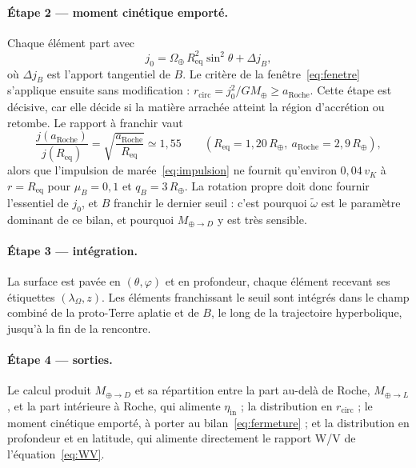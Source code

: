 \documentclass[11pt,a4paper,openany]{report}
\newcommand{\Mt}{M_{\oplus}}
\newcommand{\Rt}{R_{\oplus}}
\newcommand{\Req}{R_{\mathrm{eq}}}
\newcommand{\aR}{a_{\mathrm{Roche}}}
\begin{document}
\paragraph{Étape 2 — moment cinétique emporté.} Chaque élément part avec
\begin{equation}
j_0=\Omega_\oplus\,\Req^2\sin^2\theta+\Delta j_B,
\label{eq:j0-injection}
\end{equation}
où $\Delta j_B$ est l'apport tangentiel de $B$. Le critère de la fenêtre~\eqref{eq:fenetre}
s'applique ensuite sans modification : $r_{\mathrm{circ}}=j_0^2/G\Mt\ge\aR$. Cette étape est
décisive, car elle décide si la matière arrachée atteint la région d'accrétion ou retombe. Le
rapport à franchir vaut
\begin{equation}
\frac{j(\aR)}{j(\Req)}=\sqrt{\frac{\aR}{\Req}}\simeq1{,}55
\qquad(\Req=1{,}20\,\Rt,\ \aR=2{,}9\,\Rt),
\label{eq:saut-j}
\end{equation}
alors que l'impulsion de marée~\eqref{eq:impulsion} ne fournit qu'environ
$0{,}04\,v_K$ à $r=\Req$ pour $\mu_B=0{,}1$ et $q_B=3\,\Rt$. La rotation propre doit donc fournir
l'essentiel de $j_0$, et $B$ franchir le dernier seuil : c'est pourquoi $\tilde\omega$ est le
paramètre dominant de ce bilan, et pourquoi $M_{\oplus\to D}$ y est très sensible.

\paragraph{Étape 3 — intégration.} La surface est pavée en $(\theta,\varphi)$ et en profondeur, chaque
élément recevant ses étiquettes $(\lambda_\Omega,z)$. Les éléments franchissant le seuil sont
intégrés dans le champ combiné de la proto-Terre aplatie et de $B$, le long de la trajectoire
hyperbolique, jusqu'à la fin de la rencontre.

\paragraph{Étape 4 — sorties.} Le calcul produit $M_{\oplus\to D}$ et sa répartition entre la part
au-delà de Roche, $M_{\oplus\to L}$, et la part intérieure à Roche, qui alimente
$\eta_{\mathrm{in}}$ ; la distribution en $r_{\mathrm{circ}}$ ; le moment cinétique emporté, à
porter au bilan~\eqref{eq:fermeture} ; et la distribution en profondeur et en latitude, qui alimente
directement le rapport W/V de l'équation~\eqref{eq:WV}.
\end{document}
